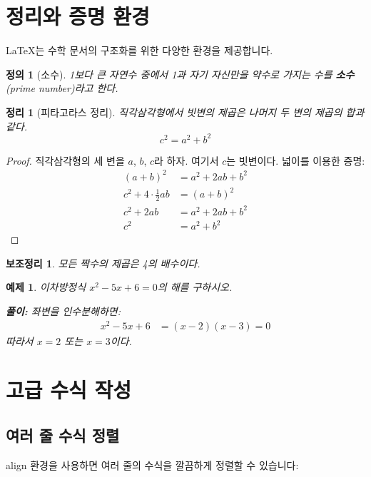 \documentclass[12pt,a4paper]{article}
\newtheorem{theorem}{정리}[section]
\newtheorem{definition}{정의}[section]
\newtheorem{example}{예제}[section]
\newtheorem{lemma}{보조정리}[section]
\begin{document}
\section{정리와 증명 환경}

LaTeX는 수학 문서의 구조화를 위한 다양한 환경을 제공합니다.

\begin{definition}[소수]
    1보다 큰 자연수 중에서 1과 자기 자신만을 약수로 가지는 수를 \textbf{소수}(prime number)라고 한다.
\end{definition}

\begin{theorem}[피타고라스 정리]\label{thm:pythagoras}
    직각삼각형에서 빗변의 제곱은 나머지 두 변의 제곱의 합과 같다.
    \[
        c^2 = a^2 + b^2
    \]
\end{theorem}

\begin{proof}
    직각삼각형의 세 변을 $a$, $b$, $c$라 하자. 여기서 $c$는 빗변이다.
    넓이를 이용한 증명:
    \begin{align}
        (a+b)^2 &= a^2 + 2ab + b^2 \nonumber \\
        c^2 + 4 \cdot \frac{1}{2}ab &= (a+b)^2 \nonumber \\
        c^2 + 2ab &= a^2 + 2ab + b^2 \nonumber \\
        c^2 &= a^2 + b^2
    \end{align}
\end{proof}

\begin{lemma}
    모든 짝수의 제곱은 4의 배수이다.
\end{lemma}

\begin{example}
    이차방정식 $x^2 - 5x + 6 = 0$의 해를 구하시오.

    \textbf{풀이:}
    좌변을 인수분해하면:
    \begin{align*}
        x^2 - 5x + 6 &= (x-2)(x-3) = 0
    \end{align*}
    따라서 $x = 2$ 또는 $x = 3$이다.
\end{example}

\section{고급 수식 작성}

\subsection{여러 줄 수식 정렬}
align 환경을 사용하면 여러 줄의 수식을 깔끔하게 정렬할 수 있습니다:
\end{document}
